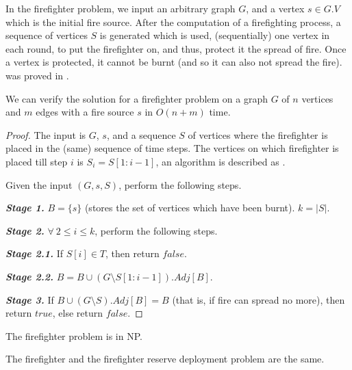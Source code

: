 In the firefighter problem, we input an arbitrary graph $G$, and a vertex $s\in G.V$ which is the initial fire source. After the computation of a firefighting process, a sequence of vertices $S$ is generated which is used, (sequentially) one vertex in each round, to put the firefighter on, and thus, protect it the spread of fire. Once a vertex is protected, it cannot be burnt (and so it can also not spread the fire).  was proved in \cite{Fomin2016}.

\begin{lemma}\label{lemma:verify-firefighter}
We can verify the solution for a firefighter problem on a graph $G$ of $n$ vertices and $m$ edges with a fire source $s$ in $O(n+m)$ time. \cite{Fomin2016}
\end{lemma}

\begin{proof}
The input is $G$, $s$, and a sequence $S$ of vertices where the firefighter is placed in the (same) sequence of time steps. The vertices on which firefighter is placed till step $i$ is $S_i = S[1:i-1]$, an algorithm is described as .

\begin{algorithm}\label{algorithm:verify-firefighter}
Given the input $(G,s,S)$, perform the following steps.
\end{algorithm}

\textbf{\textit{Stage 1.}} $B=\{s\}$ (stores the set of vertices which have been burnt). $k=|S|$.

\textbf{\textit{Stage 2.}} $\forall\ 2\leq i\leq k$, perform the following steps.

\textbf{\textit{Stage 2.1.}} If $S[i]\in T$, then return $false$.

\textbf{\textit{Stage 2.2.}} $B=B\cup (G\setminus S[1:i-1]).Adj[B]$.

\textbf{\textit{Stage 3.}} If $B\cup (G\setminus S).Adj[B]=B$ (that is, if fire can spread no more), then return $true$, else return $false$.
\end{proof}

\begin{corollary}
    The firefighter problem is in NP.
\end{corollary}

\begin{lemma}
    The firefighter and the firefighter reserve deployment problem are the same. \cite{Fomin2016}
\end{lemma}

